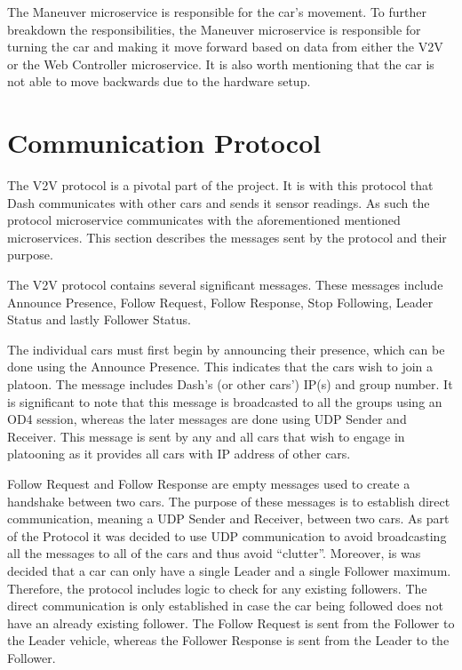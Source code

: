 \documentclass[12pt]{article}
\begin{document}
The Maneuver microservice is responsible for the car’s movement. To further breakdown the responsibilities, the Maneuver microservice is responsible for turning the car and making it move forward based on data from either the V2V or the Web Controller microservice. It is also worth mentioning that the car is not able to move backwards due to the hardware setup.\par

\section{Communication Protocol}
The V2V protocol is a pivotal part of the project. It is with this protocol that Dash communicates with other cars and sends it sensor readings. As such the protocol microservice communicates with the aforementioned mentioned microservices. This section describes the messages sent by the protocol and their purpose. \par

The V2V protocol contains several significant messages. These messages include Announce Presence, Follow Request, Follow Response, Stop Following, Leader Status and lastly Follower Status. \par

The individual cars must first begin by announcing their presence, which can be done using the Announce Presence. This indicates that the cars wish to join a platoon. The message includes Dash’s (or other cars’) IP(s) and group number. It is significant to note that this message is broadcasted to all the groups using an OD4 session, whereas the later messages are done using UDP Sender and Receiver. This message is sent by any and all cars that wish to engage in platooning as it provides all cars with IP address of other cars. \par

Follow Request and Follow Response are empty messages used to create a handshake between two cars. The purpose of these messages is to establish direct communication, meaning a UDP Sender and Receiver, between two cars. As part of the Protocol it was decided to use UDP communication to avoid broadcasting all the messages to all of the cars and thus avoid “clutter”. Moreover, is was decided that a car can only have a single Leader and a single Follower maximum. Therefore, the protocol includes logic to check for any existing followers. The direct communication is only established in case the car being followed does not have an already existing follower. The Follow Request is sent from the Follower to the Leader vehicle, whereas the Follower Response is sent from the Leader to the Follower. \par
\end{document}
